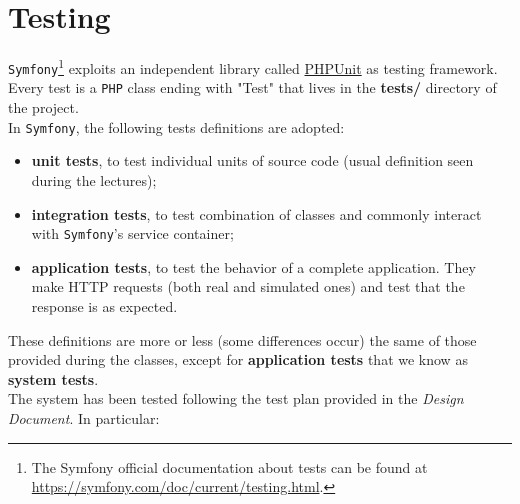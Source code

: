 \documentclass{article}
\begin{document}
\section{Testing}
\verb|Symfony|\footnote{The Symfony official documentation about tests can be found at \url{https://symfony.com/doc/current/testing.html}.} exploits an independent library called \href{https://phpunit.de/}{PHPUnit} as testing framework.
Every test is a \verb|PHP| class ending with "Test" that lives in the \textbf{tests/} directory of the project.\\
In \verb|Symfony|, the following tests definitions are adopted:
\begin{itemize}
    \item \textbf{unit tests}, to test individual units of source code (usual definition seen during the lectures);
    \item \textbf{integration tests}, to test combination of classes and commonly interact with \verb|Symfony|'s service container;
    \item \textbf{application tests}, to test the behavior of a complete application. They make HTTP requests (both real and simulated ones) and test that the response is as expected.
\end{itemize}
These definitions are more or less (some differences occur) the same of those provided during the classes, except for \textbf{application tests} that we know as \textbf{system tests}.\\
The system has been tested following the test plan provided in the \textit{Design Document}. In particular:
\end{document}
